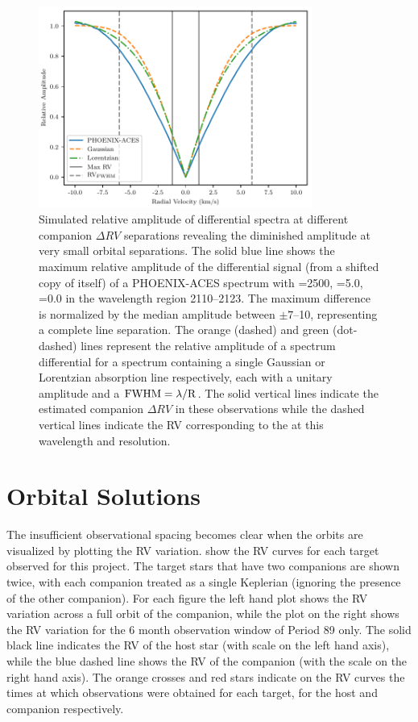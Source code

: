 \begin{figure}
    \centering
    \includegraphics[width=0.8\textwidth]{figures/direct-recovery/rv_diff_final.pdf}
    \caption[Simulated relative amplitude of differntial spectrum.]{Simulated relative amplitude of differential spectra at different companion \(\Delta {RV}\) separations revealing the diminished amplitude at very small orbital separations.
    The solid blue line shows the maximum relative amplitude of the differential signal (from a shifted copy of itself) of a {PHOENIX-ACES} spectrum with \Teff{}=2500\K{}, \logg{}=5.0, \feh{}=0.0 in the wavelength region 2110--2123\nm{}.
    The maximum difference is normalized by the median amplitude between \(\pm7\)--10\kmps{}, representing a complete line separation.
    The orange (dashed) and green (dot-dashed) lines represent the relative amplitude of a spectrum differential for a spectrum containing a single Gaussian or Lorentzian absorption line respectively, each with a unitary amplitude and a \(\rm {\textrm{FWHM}} = \lambda / R\).
    The solid vertical lines indicate the estimated companion \(\Delta {RV}\) in these observations while the dashed vertical lines indicate the {RV} corresponding to the {\fwhm} at this wavelength and resolution.}
    \label{fig:diff_amp}
\end{figure}


\section{Orbital Solutions}
\label{sec:orbtial_diagrams}
The insufficient observational spacing becomes clear when the orbits are visualized by plotting the {RV} variation.
 show the {RV} curves for each target observed for this project.
The target stars that have two companions are shown twice, with each companion treated as a single Keplerian (ignoring the presence of the other companion).
For each figure the left hand plot shows the {RV} variation across a full orbit of the companion, while the plot on the right shows the {RV} variation for the 6 month observation window of {Period 89} only.
The solid black line indicates the {RV} of the host star (with scale on the left hand axis), while the blue dashed line shows the {RV} of the companion (with the scale on the right hand axis).
The orange crosses and red stars indicate on the {RV} curves the times at which observations were obtained for each target, for the host and companion respectively.

